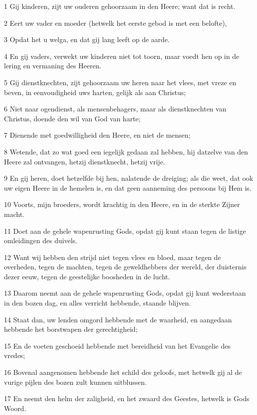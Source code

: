 \par 1 Gij kinderen, zijt uw ouderen gehoorzaam in den Heere; want dat is recht.
\par 2 Eert uw vader en moeder (hetwelk het eerste gebod is met een belofte),
\par 3 Opdat het u welga, en dat gij lang leeft op de aarde.
\par 4 En gij vaders, verwekt uw kinderen niet tot toorn, maar voedt hen op in de lering en vermaning des Heeren.
\par 5 Gij dienstknechten, zijt gehoorzaam uw heren naar het vlees, met vreze en beven, in eenvoudigheid uws harten, gelijk als aan Christus;
\par 6 Niet naar ogendienst, als mensenbehagers, maar als dienstknechten van Christus, doende den wil van God van harte;
\par 7 Dienende met goedwilligheid den Heere, en niet de mensen;
\par 8 Wetende, dat zo wat goed een iegelijk gedaan zal hebben, hij datzelve van den Heere zal ontvangen, hetzij dienstknecht, hetzij vrije.
\par 9 En gij heren, doet hetzelfde bij hen, nalatende de dreiging; als die weet, dat ook uw eigen Heere in de hemelen is, en dat geen aanneming des persoons bij Hem is.
\par 10 Voorts, mijn broeders, wordt krachtig in den Heere, en in de sterkte Zijner macht.
\par 11 Doet aan de gehele wapenrusting Gods, opdat gij kunt staan tegen de listige omleidingen des duivels.
\par 12 Want wij hebben den strijd niet tegen vlees en bloed, maar tegen de overheden, tegen de machten, tegen de geweldhebbers der wereld, der duisternis dezer eeuw, tegen de geestelijke boosheden in de lucht.
\par 13 Daarom neemt aan de gehele wapenrusting Gods, opdat gij kunt wederstaan in den bozen dag, en alles verricht hebbende, staande blijven.
\par 14 Staat dan, uw lenden omgord hebbende met de waarheid, en aangedaan hebbende het borstwapen der gerechtigheid;
\par 15 En de voeten geschoeid hebbende met bereidheid van het Evangelie des vredes;
\par 16 Bovenal aangenomen hebbende het schild des geloofs, met hetwelk gij al de vurige pijlen des bozen zult kunnen uitblussen.
\par 17 En neemt den helm der zaligheid, en het zwaard des Geestes, hetwelk is Gods Woord.
